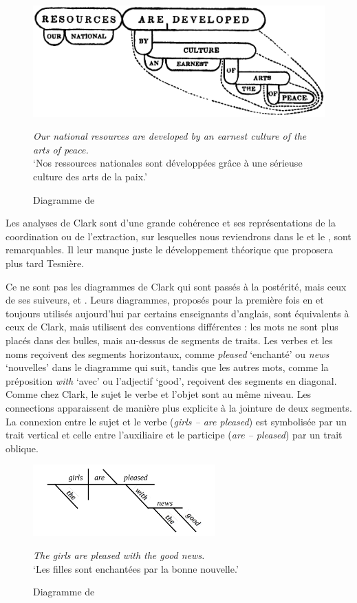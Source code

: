 {    \begin{figure}[H]
    \caption{\label{fig:}Diagramme de \citet[17]{Clark1847}}
    \includegraphics[width=.75\textwidth]{figures/Clark1847.png}\smallskip\\    
    \noindent\parbox{.75\textwidth}{\small\textit{Our national resources are developed by an earnest culture of the arts of peace.}\\
    ‘Nos ressources nationales sont développées grâce à une sérieuse culture des arts de la paix.’}
    \end{figure}

    Les analyses de Clark sont d’une grande cohérence et ses représentations de la coordination ou de l’extraction, sur lesquelles nous reviendrons dans le  et le , sont remarquables. Il leur manque juste le développement théorique que proposera plus tard Tesnière.

    Ce ne sont pas les diagrammes de Clark qui sont passés à la postérité, mais ceux de ses suiveurs,  et . Leurs diagrammes, proposés pour la première fois en \citeyear{ReedKellogg1877} et toujours utilisés aujourd’hui par certains enseignants d’anglais, sont équivalents à ceux de Clark, mais utilisent des conventions différentes : les mots ne sont plus placés dans des bulles, mais au-dessus de segments de traits. Les verbes et les noms reçoivent des segments horizontaux, comme \textit{pleased} ‘enchanté’ ou \textit{news} ‘nouvelles’ dans le diagramme qui suit, tandis que les autres mots, comme la préposition \textit{with} ‘avec’ ou l’adjectif ‘good’, reçoivent des segments en diagonal. Comme chez Clark, le sujet le verbe et l’objet sont au même niveau. Les connections apparaissent de manière plus explicite à la jointure de deux segments. La connexion entre le sujet et le verbe (\textit{girls – are pleased}) est symbolisée par un trait vertical et celle entre l’auxiliaire et le participe (\textit{are – pleased}) par un trait oblique.

    \begin{figure}[H]
    \includegraphics[width=7cm]{figures/ReedKellog}\smallskip\\    
    \noindent\parbox{7cm}{\small\textit{The girls are pleased with the good news.}\\
    ‘Les filles sont enchantées par la bonne nouvelle.’}
    \caption{Diagramme de \citet{ReedKellogg1877}}
    \end{figure}

}
